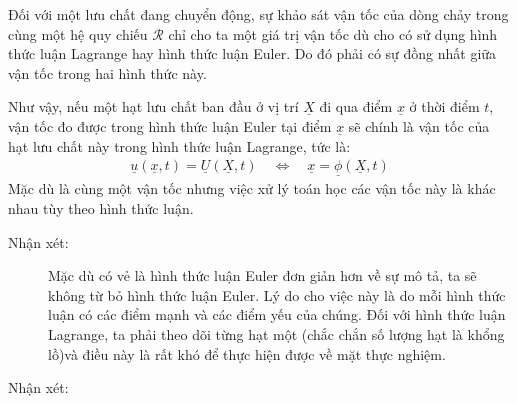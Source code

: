 \documentclass[../../../main.tex]{subfiles}
\begin{document}
    Đối với một lưu chất đang chuyển động, sự khảo sát vận tốc của dòng chảy trong cùng một hệ quy chiếu $\mathcal{R}$ chỉ cho ta một giá trị vận tốc dù cho có sử dụng hình thức luận Lagrange hay hình thức luận Euler. Do đó phải có sự đồng nhất giữa vận tốc trong hai hình thức này.
    
    Như vậy, nếu một hạt lưu chất ban đầu ở vị trí $\underline{X}$ đi qua điểm $\underline{x}$ ở thời điểm $t$, vận tốc đo được trong hình thức luận Euler tại điểm $\underline{x}$ sẽ chính là vận tốc của hạt lưu chất này trong hình thức luận Lagrange, tức là:
    	\begin{align}
    		\underline{u}\left(\underline{x},t\right)=\underline{U}\left(\underline{X},t\right)\quad\Longleftrightarrow \quad\underline{x}=\underline{\phi}\left(\underline{X},t\right)
    	\end{align}
    Mặc dù là cùng một vận tốc nhưng việc xử lý toán học các vận tốc này là khác nhau tùy theo hình thức luận.

    \begin{description}
        \item[Nhận xét:] Mặc dù có vẻ là hình thức luận Euler đơn giản hơn về sự mô tả, ta sẽ không từ bỏ hình thức luận Euler. Lý do cho việc này là do mỗi hình thức luận có các điểm mạnh và các điểm yếu của chúng. Đối với hình thức luận Lagrange, ta phải theo dõi từng hạt một (chắc chắn số lượng hạt là khổng lồ)và điều này là rất khó để thực hiện được về mặt thực nghiệm.
        \item[Nhận xét:] 
    \end{description}
\end{document}
